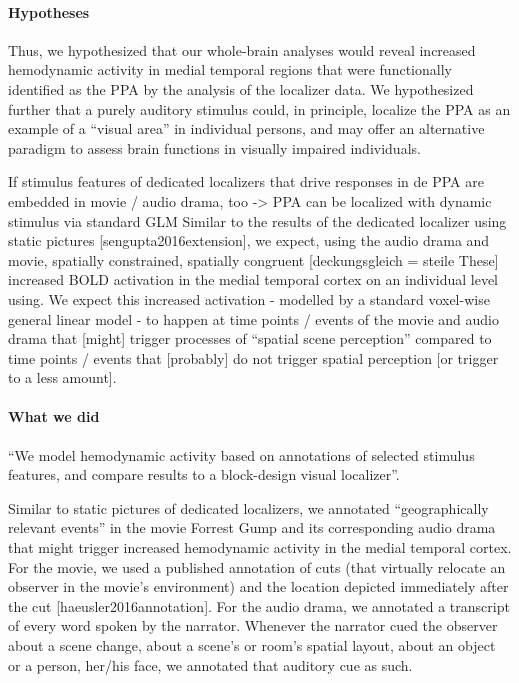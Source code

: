 \paragraph{Hypotheses}

Thus, we hypothesized that our whole-brain analyses would reveal increased
hemodynamic activity in medial temporal regions that were functionally
identified as the PPA by the analysis of the localizer data.
We hypothesized further that a purely auditory stimulus could, in principle,
localize the PPA as an example of a ``visual area'' in individual persons,
and may offer an alternative paradigm to assess brain functions in visually
impaired individuals.


%
If stimulus features of dedicated localizers that drive responses in de PPA are
embedded in movie / audio drama, too -> PPA can be localized with dynamic
stimulus via standard GLM
%
Similar to the results of the dedicated localizer using static pictures
[sengupta2016extension], we expect, using the audio drama and movie, spatially
constrained, spatially congruent [deckungsgleich = steile These] increased BOLD
activation in the medial temporal cortex on an individual level using. We expect
this increased activation - modelled by a standard voxel-wise general linear
model - to happen at time points / events of the movie and audio drama that
[might] trigger processes of “spatial scene perception” compared to time points
/ events that [probably] do not trigger spatial perception [or trigger to a less
amount].

\paragraph{What we did}

``We model hemodynamic activity based on annotations of selected stimulus
features,
and compare results to a block-design visual localizer''.

Similar to static pictures of dedicated localizers, we annotated “geographically
relevant events” in the movie Forrest Gump and its corresponding audio drama
that might trigger increased hemodynamic activity in the medial temporal cortex.
%
For the movie, we used a published annotation of cuts (that virtually relocate
an observer in the movie’s environment) and the location depicted immediately
after the cut [haeusler2016annotation].
%
For the audio drama, we annotated a transcript of every word spoken by the
narrator. Whenever the narrator cued the observer about a scene change, about a
scene’s or room’s spatial layout, about an object or a person, her/his face, we
annotated that auditory cue as such.

